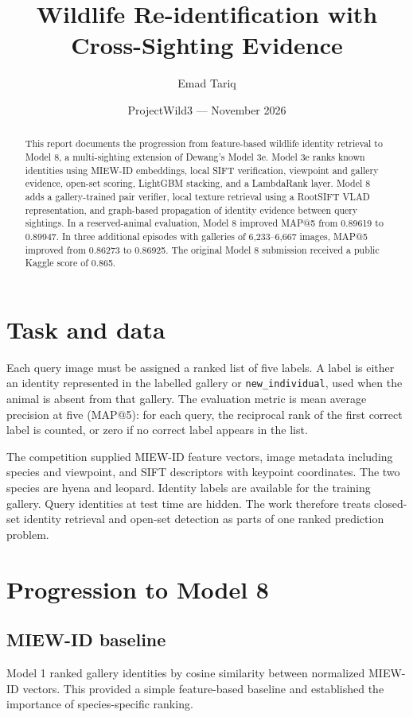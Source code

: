 \documentclass[11pt]{article}
\title{Wildlife Re-identification with Cross-Sighting Evidence}
\author{Emad Tariq}
\date{ProjectWild3 --- November 2026}
\begin{document}
\maketitle

\begin{abstract}
This report documents the progression from feature-based wildlife identity retrieval to Model 8, a multi-sighting extension of Dewang's Model 3e. Model 3e ranks known identities using MIEW-ID embeddings, local SIFT verification, viewpoint and gallery evidence, open-set scoring, LightGBM stacking, and a LambdaRank layer. Model 8 adds a gallery-trained pair verifier, local texture retrieval using a RootSIFT VLAD representation, and graph-based propagation of identity evidence between query sightings. In a reserved-animal evaluation, Model 8 improved MAP@5 from 0.89619 to 0.89947. In three additional episodes with galleries of 6,233--6,667 images, MAP@5 improved from 0.86273 to 0.86925. The original Model 8 submission received a public Kaggle score of 0.865.
\end{abstract}

\section{Task and data}
Each query image must be assigned a ranked list of five labels. A label is either an identity represented in the labelled gallery or \texttt{new\_individual}, used when the animal is absent from that gallery. The evaluation metric is mean average precision at five (MAP@5): for each query, the reciprocal rank of the first correct label is counted, or zero if no correct label appears in the list.

The competition supplied MIEW-ID feature vectors, image metadata including species and viewpoint, and SIFT descriptors with keypoint coordinates. The two species are hyena and leopard. Identity labels are available for the training gallery. Query identities at test time are hidden. The work therefore treats closed-set identity retrieval and open-set detection as parts of one ranked prediction problem.

\section{Progression to Model 8}
\subsection{MIEW-ID baseline}
Model 1 ranked gallery identities by cosine similarity between normalized MIEW-ID vectors. This provided a simple feature-based baseline and established the importance of species-specific ranking.
\end{document}
